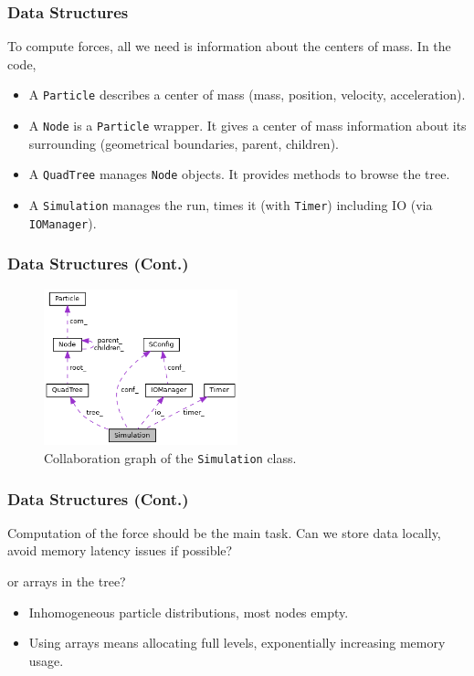 \begin{frame}
	\frametitle{Data Structures}
	To compute forces, all we need is information about the centers of mass. In the code,
	\begin{itemize}
		\item A \lstinline{Particle} describes a center of mass (mass, position, velocity, acceleration).
		\item A \lstinline{Node} is a \lstinline{Particle} wrapper. It gives a center of mass information about its surrounding (geometrical boundaries, parent, children).
		\item A \lstinline{QuadTree} manages \lstinline{Node} objects. It provides methods to browse the tree.
		\item A \lstinline{Simulation} manages the run, times it (with \lstinline|Timer|) including IO (via \lstinline{IOManager}).
	\end{itemize}
\end{frame}

\begin{frame}
	\frametitle{Data Structures (Cont.)}
	\begin{figure}
		\centering
		\includegraphics[width=0.5\textwidth]{inclfigs/class_simulation.png}
		\caption{Collaboration graph of the \lstinline|Simulation| class.}
	\end{figure}
\end{frame}

\begin{frame}
	\frametitle{Data Structures (Cont.)}
	Computation of the force should be the main task. Can we store data locally, avoid memory latency issues if possible?
	
	 or arrays in the tree?
	\begin{itemize}
		\item Inhomogeneous particle distributions, most nodes empty.
		\item Using arrays means allocating full levels, exponentially increasing memory usage.
	\end{itemize}
\end{frame}

